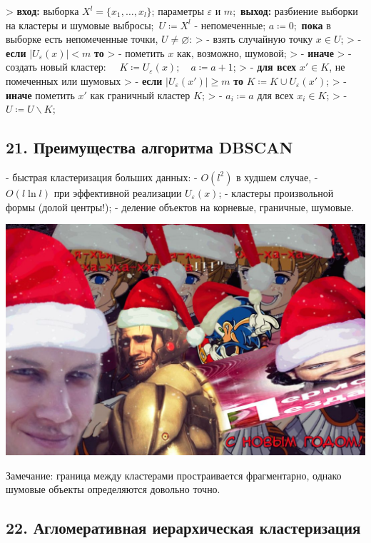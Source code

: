 > \textbf{вход:} выборка $X^l = {\lbrace x_1, \ldots, x_l \rbrace}$; параметры $\varepsilon$ и $m$;\
\textbf{выход:} разбиение выборки на кластеры и шумовые выбросы;\
$U \coloneqq X^l$ - непомеченные; $a \coloneqq 0$;\
\textbf{пока} в выборке есть непомеченные точки, $U \neq \varnothing$:
> - взять случайную точку $x \in U$;
> - \textbf{если} ${\vert U_{\varepsilon}{(x)} \vert} < m$ \textbf{то}
>   - пометить $x$ как, возможно, шумовой;
> - \textbf{иначе}
>   - создать новый кластер: $\quad K \coloneqq U_{\varepsilon}{(x)}; \quad a \coloneqq a + 1$;
>   - \textbf{для всех} $x' \in K$, не помеченных или шумовых
>       - \textbf{если} ${\vert U_{\varepsilon}{(x')} \vert} \geqslant m$ \textbf{то} $K \coloneqq K \cup U_{\varepsilon}{(x')}$;
>       - \textbf{иначе} пометить $x'$ как граничный кластер $K$;
>   - $a_i \coloneqq a$ для всех $x_i \in K$;
>   - $U \coloneqq U \backslash K$;

\subsection{21. Преимущества алгоритма DBSCAN}

- быстрая кластеризация больших данных:
    - $O{(l^2)}$ в худшем случае,
    - $O{(l \ln{l})}$ при эффективной реализации $U_{\varepsilon}{(x)}$;
- кластеры произвольной формы (долой центры!);
- деление объектов на корневые, граничные, шумовые.

\includegraphics[scale=0.3]{figures/samplefigure.jpg}

Замечание: граница между кластерами простраивается фрагментарно, однако
шумовые объекты определяются довольно точно.

\subsection{22. Агломеративная иерархическая кластеризация}

